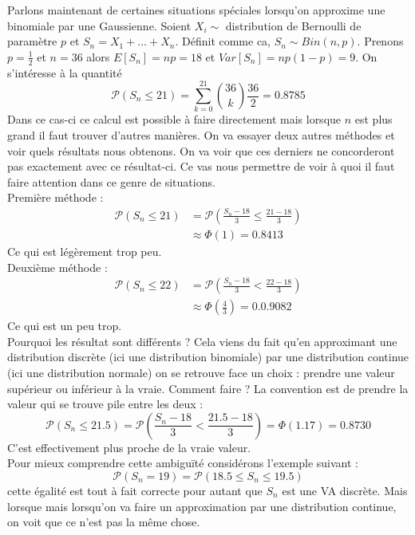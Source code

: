 \documentclass[a4paper,12pt]{report}
\theoremstyle{definition}
\renewcommand{\(}{\left(}
\renewcommand{\)}{\right)}
\renewcommand{\P}{\mathcal{P}}
\begin{document}
        Parlons maintenant de certaines situations spéciales lorsqu'on approxime une binomiale par une Gaussienne. Soient $X_i\sim$ distribution de Bernoulli de paramètre $p$ et $S_n = X_1+\dots+X_n$. Définit comme ca, $S_n\sim Bin(n,p)$. Prenons $p=\frac{1}{2}$ et $n=36$ alors $E[S_n] =np = 18$ et $Var[S_n] = np(1-p)=9$. On s'intéresse à la quantité $$\P(S_n\leq 21) = \sum_{k=0}^{21} {36\choose k}\frac{36}{2} = 0.8785$$ 
        Dans ce cas-ci ce calcul est possible à faire directement mais lorsque $n$ est plus grand il faut trouver d'autres manières. On va essayer deux autres méthodes et voir quels résultats nous obtenons. On va voir que ces derniers ne concorderont pas exactement avec ce résultat-ci. Ce vas nous permettre de voir à quoi il faut faire attention dans ce genre de situations.\\
        Première méthode :
        \begin{align*}
            \P(S_n\leq 21) &= \P\left( \frac{S_n-18}{3} \leq \frac{21-18}{3} \right) \\
            &\approx \Phi(1) = 0.8413
        \end{align*}
        Ce qui est légèrement trop peu.\\
        Deuxième méthode :
        \begin{align*}
            \P(S_n\leq 22) &= \P\left( \frac{S_n-18}{3} < \frac{22-18}{3} \right) \\
            &\approx \Phi\left( \frac{4}{3} \right) = 0.0.9082
        \end{align*}
        Ce qui est un peu trop. \\
        Pourquoi les résultat sont différents ? Cela viens du fait qu'en approximant une distribution discrète (ici une distribution binomiale) par une distribution continue (ici une distribution normale) on se retrouve face un choix : prendre une valeur supérieur ou inférieur à la vraie. Comment faire ? La convention est de prendre la valeur qui se trouve pile entre les deux :
        $$\P(S_n \leq 21.5) = \P\left( \frac{S_n-18}{3} <\frac{21.5-18}{3}\right) = \Phi(1.17) = 0.8730$$
        C'est effectivement plus proche de la vraie valeur.\\
        
        Pour mieux comprendre cette ambiguïté considérons l'exemple suivant :
        $$\P(S_n=19)=\P(18.5\leq S_n\leq 19.5)$$
        cette égalité est tout à fait correcte pour autant que $S_n$ est une VA discrète. Mais lorsque mais lorsqu'on va faire un approximation par une distribution continue, on voit que ce n'est pas la même chose.\\
        
\end{document}
